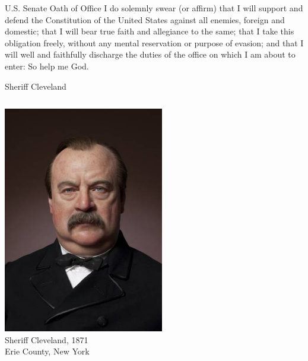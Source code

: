 \begin{frame}
    \begin{block}{U.S. Senate Oath of Office}
    I do solemnly swear (or affirm) that I will support and defend the Constitution of the United States against all enemies, foreign and domestic; that I will bear true faith and allegiance to the same; that I take this obligation freely, without any mental reservation or purpose of evasion; and that I will well and faithfully discharge the duties of the office on which I am about to enter: So help me God.
    \end{block}
\end{frame}

\begin{frame}{Sheriff Cleveland}
    \begin{columns}[onlytextwidth]
            \centering
            \includegraphics[width=0.75\textwidth]{img/cleveland.png} \\

            \centering
            Sheriff Cleveland, 1871 \\
            Erie County, New York
    \end{columns}
\end{frame}

